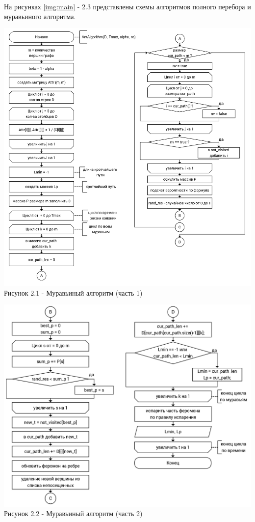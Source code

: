\documentclass[12pt]{report}
\begin{document}
На рисунках \ref{img:main} - 2.3 представлены схемы алгоритмов полного перебора и муравьиного алгоритма.

	\begin{center}
	\label{img:main} 
	\includegraphics[scale = 0.3]{ant_1} \\ Рисунок 2.1 - Муравьиный алгоритм (часть 1)
\end{center}

\begin{center}
	\label{img:subr} 
	\includegraphics[scale = 0.42]{ant_2} \\ Рисунок 2.2 - Муравьиный алгоритм (часть 2)
\end{center}
\end{document}
